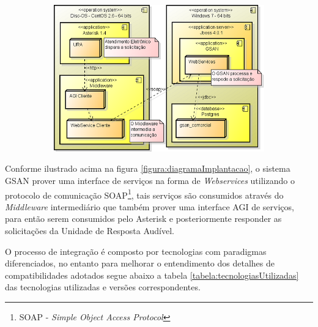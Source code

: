 \begin{figure}[H]
	\centering
	\caption{\textbf{Diagrama de implantação da solução}}
	\label{figura:diagramaImplantacao}
	\begin{subfigure}[H]{\textwidth}
		\centering
		\includegraphics{figuras/diagrama_implantacao.png}
	\end{subfigure}
\end{figure}


Conforme ilustrado acima na figura \ref{figura:diagramaImplantacao}, o sistema GSAN prover uma interface de serviços na forma de \textit{Webservices} utilizando o protocolo de comunicação SOAP\footnote{SOAP - \textit{Simple Object Access Protocol}}, tais serviços são consumidos através do \textit{Middleware} intermediário que também prover uma interface AGI de serviços, para então serem consumidos pelo Asterisk e posteriormente responder as solicitações da Unidade de Resposta Audível.

O processo de integração é composto por tecnologias com paradigmas diferenciados, no entanto para melhorar o entendimento dos detalhes de compatibilidades adotados segue abaixo a tabela \ref{tabela:tecnologiasUtilizadas} das tecnologias utilizadas e versões correspondentes.


